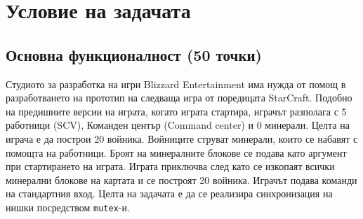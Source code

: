 \documentclass[a4paper,10pt]{article}
\begin{document}
	
	\section{Условие на задачата}
	
		\subsection{Основна функционалност (50 точки)}

			Студиото за разработка на игри Blizzard Entertainment има нужда от помощ в разработването на прототип на следваща игра от поредицата StarCraft. Подобно на предишните версии на играта, когато играта стартира, играчът разполага с 5 работници (SCV), Команден център (Command center) и 0 минерали. Целта на играча е да построи 20 войника. Войниците струват минерали, които се набавят с помощта на работници. Броят на минералните блокове се подава като аргумент при стартирането на играта. Играта приключва след като се изкопаят всички минерални блокове на картата и се построят 20 войника. Играчът подава команди на стандартния вход. Целта на задачата е да се реализира синхронизация на нишки посредством \verb|mutex|-и.
\end{document}
